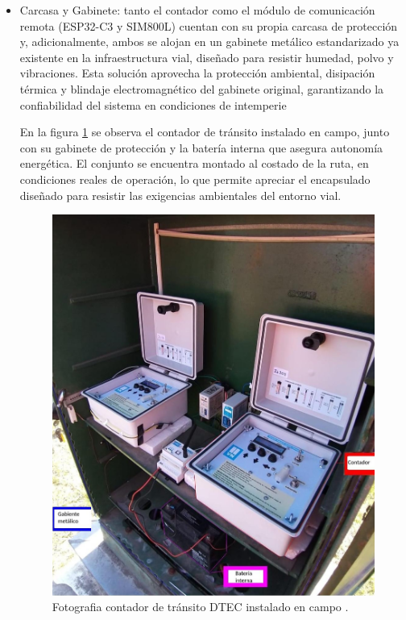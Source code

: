 \begin{itemize}
\item Carcasa y Gabinete: tanto el contador como el módulo de comunicación remota (ESP32-C3 y SIM800L) cuentan con su propia carcasa de protección y, adicionalmente, ambos se alojan en un gabinete metálico estandarizado ya existente en la infraestructura vial, diseñado para resistir humedad, polvo y vibraciones. Esta solución aprovecha la protección ambiental, disipación térmica y blindaje electromagnético del gabinete original, garantizando la confiabilidad del sistema en condiciones de intemperie

En la figura \ref{fig:foto_gabinete} se observa el contador de tránsito instalado en campo, junto con su gabinete de protección y la batería interna que asegura autonomía energética. El conjunto se encuentra montado al costado de la ruta, en condiciones reales de operación, lo que permite apreciar el encapsulado diseñado para resistir las exigencias ambientales del entorno vial.


\begin{figure}[H]
  \centering
  \includegraphics[width=1\linewidth]{./Figures/fotoGabinete.jpeg}
  \caption{Fotografia contador de tránsito DTEC instalado en campo \protect\footnotemark.}
  \label{fig:foto_gabinete}
\end{figure}

\end{itemize}


